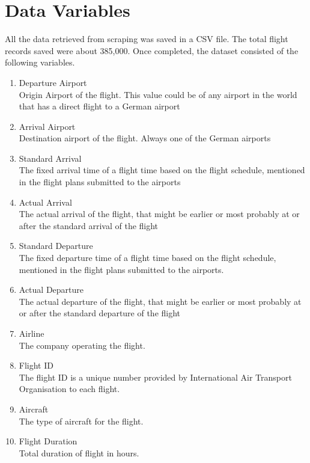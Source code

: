 \section{Data Variables}
All the data  retrieved from scraping was saved in a CSV file. The total flight records saved were about 385,000. Once completed, the dataset consisted of the following variables.
\begin{enumerate}
    \item {Departure Airport}
    \\Origin Airport of the flight. This value could be of any airport in the world that has a direct flight to a German airport
    \item {Arrival Airport}
    \\Destination airport of the flight. Always one of the German airports
    \item {Standard Arrival}
    \\The fixed arrival time of a flight time based on the flight schedule, mentioned in the flight plans submitted to the airports
    \item {Actual Arrival}
    \\The actual arrival of the flight, that might be earlier or most probably at or after the standard arrival of the flight
    \item {Standard Departure}
    \\The fixed departure time of a flight time based on the flight schedule, mentioned in the flight plans submitted to the airports.
    \item {Actual Departure}
    \\The actual departure of the flight, that might be earlier or most probably at or after the standard departure of the flight
    \item {Airline}
    \\The company operating the flight.
    \item {Flight ID}
    \\The flight ID is a unique number provided by International Air Transport Organisation to each flight.
    \item {Aircraft}
    \\The type of aircraft for the flight.
    \item {Flight Duration}
    \\Total duration of flight in hours.
\end{enumerate}

